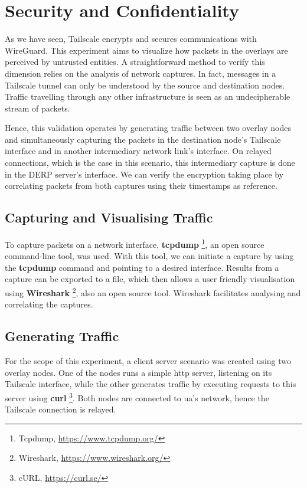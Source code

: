 \documentclass[11pt,twoside,a4paper]{report}
\begin{document}
\section{Security and Confidentiality}

As we have seen, Tailscale encrypts and secures communications with WireGuard. This experiment aims to visualize how packets in the overlays are perceived by untrusted entities. A straightforward method to verify this dimension relies on the analysis of network captures. In fact, messages in a Tailscale tunnel can only be understood by the source and destination nodes. Traffic travelling through any other infrastructure is seen as an undecipherable stream of packets.

Hence, this validation operates by generating traffic between two overlay nodes and simultaneously capturing the packets in the destination node's Tailscale interface and in another intermediary network link's interface. On relayed connections, which is the case in this scenario, this intermediary capture is done in the \ac{DERP} server's interface. We can verify the encryption taking place by correlating packets from both captures using their timestamps as reference.

\subsection{Capturing and Visualising Traffic}

To capture packets on a network interface, \textbf{tcpdump} \footnote{Tcpdump, \url{https://www.tcpdump.org/}}, an open source command-line tool, was used. With this tool, we can initiate a capture by using the \textbf{tcpdump} command and pointing to a desired interface. Results from a capture can be exported to a file, which then allows a user friendly visualisation using \textbf{Wireshark} \footnote{Wireshark, \url{https://www.wireshark.org/}}, also an open source tool. Wireshark facilitates analysing and correlating the captures.

\subsection{Generating Traffic}

For the scope of this experiment, a client server scenario was created using two overlay nodes. One of the nodes runs a simple \ac{http} server, listening on its Tailscale interface, while the other generates traffic by executing requests to this server using \textbf{curl} \footnote{cURL, \url{https://curl.se/}}. Both nodes are connected to \ac{ua}'s network, hence the Tailscale connection is relayed.
\end{document}
